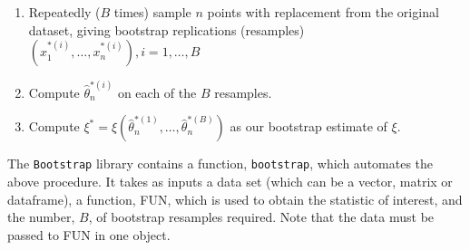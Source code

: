 \documentclass{article}\usepackage[]{graphicx}\usepackage[]{color}
\begin{document}
\begin{enumerate}
\item Repeatedly ($B$ times) sample $n$ points with replacement from the original
dataset, giving bootstrap replications (resamples) $(x_1^{*(i)},\ldots,x_n^{*(i)}), i=1,\ldots,B$
\item Compute $\hat\theta_n^{*(i)}$ on each of the $B$ resamples.
\item Compute $\xi^*=\xi(\hat\theta_n^{*(1)},\ldots,\hat\theta_n^{*(B)})$ as our bootstrap estimate of $\xi$.
\end{enumerate}

The \texttt{Bootstrap} library contains a function, \texttt{bootstrap}, which automates the above procedure. It takes as inputs a data set (which can be a vector, matrix or dataframe), a function, FUN, which is used to obtain the statistic of interest, and the number, $B$, of bootstrap resamples required. Note that the data must be passed to FUN in one object.
\end{document}
